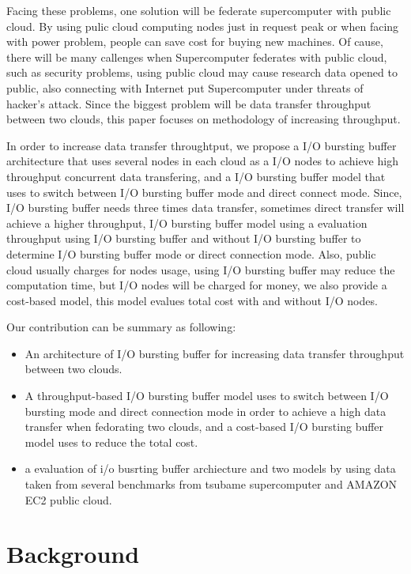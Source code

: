 \documentclass[JIP,draft]{ipsj}
\begin{document}
Facing these problems, one solution will be federate supercomputer with public cloud.
By using pulic cloud computing nodes just in request peak or when facing with power problem, people can save cost for buying new machines.
Of cause, there will be many callenges when Supercomputer federates with public cloud, such as security problems, using public cloud may cause research data opened to public, also connecting with Internet put Supercomputer under threats of hacker's attack.
Since the biggest problem will be data transfer throughput between two clouds, this paper focuses on methodology of increasing throughput.

In order to increase data transfer throughtput, we propose a I/O bursting buffer architecture that uses several nodes in each cloud as a I/O nodes to achieve high throughput concurrent data transfering, and a I/O bursting buffer model that uses to switch between I/O bursting buffer mode and direct connect mode.
Since, I/O bursting buffer needs three times data transfer, sometimes direct transfer will achieve a higher throughput, I/O bursting buffer model using a evaluation throughput using I/O bursting buffer and without I/O bursting buffer to determine I/O bursting buffer mode or direct connection mode.
Also, public cloud usually charges for nodes usage, using I/O bursting buffer may reduce the computation time, but I/O nodes will be charged for money, we also provide a cost-based model, this model evalues total cost with and without I/O nodes.

Our contribution can be summary as following:
\begin{itemize}
	\item An architecture of I/O bursting buffer for increasing data transfer throughput between two clouds.
	\item A throughput-based I/O bursting buffer model uses to switch between I/O bursting mode and direct connection mode in order to achieve a high data transfer when fedorating two clouds, and a cost-based I/O bursting buffer model uses to reduce the total cost.
	\item a evaluation of i/o busrting buffer archiecture and two models by using data taken from several benchmarks from tsubame supercomputer and AMAZON EC2 public cloud.
\end{itemize}
\section{Background}
\end{document}
